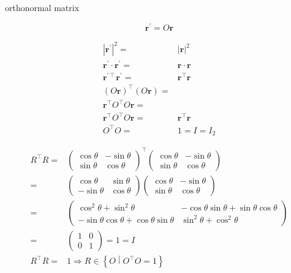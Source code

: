 \documentclass[
]{book}
\theoremstyle{definition}
\theoremstyle{definition}
\theoremstyle{definition}
\theoremstyle{definition}
\theoremstyle{remark}
\begin{document}
orthonormal matrix

\[
\boldsymbol{r}^{\prime}=O\boldsymbol{r}
\]

\[
\begin{aligned}
\left|\boldsymbol{r}^{\prime}\right|^{2}= & \left|\boldsymbol{r}\right|^{2}\\
\boldsymbol{r}^{\prime}\cdot\boldsymbol{r}^{\prime}= & \boldsymbol{r}\cdot\boldsymbol{r}\\
\boldsymbol{r}^{\prime\intercal}\boldsymbol{r}^{\prime}= & \boldsymbol{r}^{\intercal}\boldsymbol{r}\\
\left(O\boldsymbol{r}\right)^{\intercal}\left(O\boldsymbol{r}\right)=\\
\boldsymbol{r}^{\intercal}O^{\intercal}O\boldsymbol{r}=\\
\boldsymbol{r}^{\intercal}O^{\intercal}O\boldsymbol{r}= & \boldsymbol{r}^{\intercal}\boldsymbol{r}\\
O^{\intercal}O= & 1=I=I_{{\scriptscriptstyle 2}}
\end{aligned}
\]

\[
\begin{aligned}
R^{\intercal}R= & \begin{pmatrix}\cos\theta & -\sin\theta\\
\sin\theta & \cos\theta
\end{pmatrix}^{\intercal}\begin{pmatrix}\cos\theta & -\sin\theta\\
\sin\theta & \cos\theta
\end{pmatrix}\\
= & \begin{pmatrix}\cos\theta & \sin\theta\\
-\sin\theta & \cos\theta
\end{pmatrix}\begin{pmatrix}\cos\theta & -\sin\theta\\
\sin\theta & \cos\theta
\end{pmatrix}\\
= & \begin{pmatrix}\cos^{2}\theta+\sin^{2}\theta & -\cos\theta\sin\theta+\sin\theta\cos\theta\\
-\sin\theta\cos\theta+\cos\theta\sin\theta & \sin^{2}\theta+\cos^{2}\theta
\end{pmatrix}\\
= & \begin{pmatrix}1 & 0\\
0 & 1
\end{pmatrix}=1=I\\
R^{\intercal}R= & 1\Rightarrow R\in\left\{ O\middle|O^{\intercal}O=1\right\} 
\end{aligned}
\]
\end{document}
